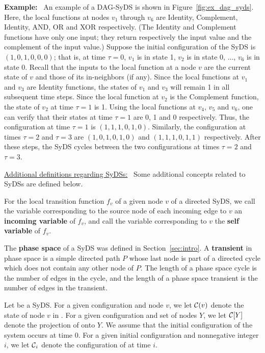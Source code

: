\noindent
\textbf{Example:}~ An example of a DAG-SyDS is shown in
Figure~\ref{fig:ex_dag_syds}.
Here, the local functions at nodes $v_1$ through
$v_6$ are Identity, Complement, Identity, AND, OR and
XOR respectively.
(The Identity and Complement functions have only one input;
they return respectively the input value and the complement of
the input value.)
Suppose the initial configuration of the SyDS is $(1, 0, 1, 0, 0, 0)$;
that is, at time $\tau = 0$, $v_1$ is in state 1, 
$v_2$ is in state 0, $\ldots$, $v_6$ is in state 0.
Recall that the inputs to the local function at a node $v$ are the current
state of $v$ and those of its in-neighbors (if any).
Since the local functions at $v_1$ and $v_3$ are Identity functions,
the states of $v_1$ and $v_3$ will remain 1 in all subsequent time steps.
Since the local function at $v_2$ is the Complement function, the state of
$v_2$ at time $\tau = 1$ is 1.
Using the local functions at $v_4$, $v_5$ and $v_6$, one can verify that
their states at time $\tau = 1$ are 0, 1 and 0 respectively.
Thus, the configuration at time $\tau = 1$ is 
$(1, 1, 1, 0, 1, 0)$.
Similarly, the configuration at times $\tau = 2$ and
$\tau = 3$ are  $(1, 0, 1, 0, 1, 0)$ and $(1, 1, 1, 0, 1, 1)$
respectively.
After these steps, the SyDS cycles between the two configurations
at times $\tau =2$ and $\tau = 3$.

\smallskip
\noindent
\underline{\textsf{Additional definitions regarding SyDSs:}}~
Some additional concepts
related to SyDSs are defined below.

\begin{definition}\label{def:variable_typesl}
For the local transition function $f_v$ of a given node $v$ of a directed  SyDS,
we call the variable corresponding to the source node 
of each incoming edge to $v$ an {\bf incoming variable} of $f_v$,
and call the variable corresponding to $v$ the  {\bf self variable} of $f_v$.
\end{definition}

The \textbf{phase space} of a SyDS was defined in Section~\ref{sec:intro}.
A \textbf{transient} in phase space is a simple directed path $P$ whose
last node is part of a directed cycle which does not 
contain any other node of $P$.
The length of a phase space cycle is the number of edges in the cycle,
and the length of a phase space transient is the number of edges in the transient.

Let \cals{} be a SyDS.
For a given configuration \calc{} and node $v$,
we let $\mbox{$\mathcal{C}$}(v)$ denote the state of node $v$ in \calc{}.
For a given configuration \calc{} and set of nodes $Y$,
we let $\mbox{$\mathcal{C}$}[Y]$ denote the projection of \calc{} onto $Y$.
We assume that the initial configuration of the system 
occurs at time 0.
For a given initial configuration \calc{} and nonnegative integer $i$,
we let $\mbox{$\mathcal{C}$}_i$ denote the configuration of \cals{} at time $i$.

